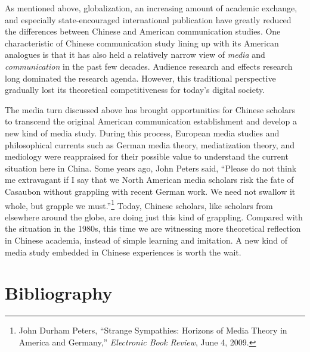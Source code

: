 \documentclass{tufte-handout}
\begin{document}
As mentioned above, globalization, an increasing amount of academic
exchange, and especially state-encouraged international publication have
greatly reduced the differences between Chinese and American
communication studies. One characteristic of Chinese communication study
lining up with its American analogues is that it has also held a
relatively narrow view of \emph{media} and \emph{communication} in the
past few decades. Audience research and effects research long dominated
the research agenda. However, this traditional perspective gradually
lost its theoretical competitiveness for today's digital society.

The media turn discussed above has brought opportunities for Chinese
scholars to transcend the original American communication establishment
and develop a new kind of media study. During this process, European
media studies and philosophical currents such as German media theory,
mediatization theory, and mediology were reappraised for their possible
value to understand the current situation here in China. Some years ago,
John Peters said, ``Please do not think me extravagant if I say that we
North American media scholars risk the fate of Casaubon without
grappling with recent German work. We need not swallow it whole, but
grapple we must.''\footnote{John Durham Peters, ``Strange Sympathies:
  Horizons of Media Theory in America and Germany,'' \emph{Electronic
  Book Review}, June 4, 2009.} Today, Chinese scholars, like scholars
from elsewhere around the globe, are doing just this kind of grappling.
Compared with the situation in the 1980s, this time we are witnessing
more theoretical reflection in Chinese academia, instead of simple
learning and imitation. A new kind of media study embedded in Chinese
experiences is worth the wait.







\section{Bibliography}\label{bibliography}
\end{document}
